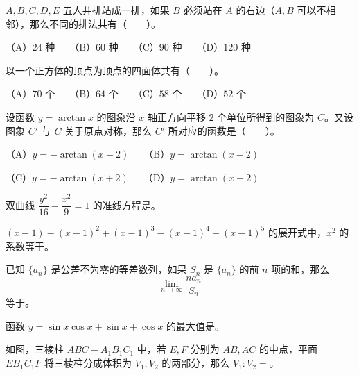 \begin{question}
$A,B,C,D,E$ 五人并排站成一排，如果 $B$ 必须站在 $A$ 的右边（$A,B$ 可以不相邻），那么不同的排法共有\mbox{（　　）}。

（A）$24$ 种　　（B）$60$ 种　　（C）$90$ 种　　（D）$120$ 种

\end{question}
\begin{question}
以一个正方体的顶点为顶点的四面体共有\mbox{（　　）}。

（A）$70$ 个　　（B）$64$ 个　　（C）$58$ 个　　（D）$52$ 个

\end{question}
\begin{question}
设函数 $y=\arctan x$ 的图象沿 $x$ 轴正方向平移 $2$ 个单位所得到的图象为 $C$。又设图象 $C'$ 与 $C$ 关于原点对称，那么 $C'$ 所对应的函数是\mbox{（　　）}。

（A）$y=-\arctan(x-2)$　　（B）$y=\arctan(x-2)$

（C）$y=-\arctan(x+2)$　　（D）$y=\arctan(x+2)$

\end{question}

\begin{question}
双曲线 $\dfrac{y^2}{16}-\dfrac{x^2}{9}=1$ 的准线方程是\gkblank{}。

\end{question}
\begin{question}
$(x-1)-(x-1)^2+(x-1)^3-(x-1)^4+(x-1)^5$ 的展开式中，$x^2$ 的系数等于\gkblank{}。

\end{question}
\begin{question}
已知 $\{a_n\}$ 是公差不为零的等差数列，如果 $S_n$ 是 $\{a_n\}$ 的前 $n$ 项的和，那么
\nopagebreak[4]
\[
\lim_{n\to\infty}\frac{na_n}{S_n}
\]
等于\gkblank{}。

\end{question}
\begin{question}
函数 $y=\sin x\cos x+\sin x+\cos x$ 的最大值是\gkblank{}。

\Needspace{0.4\textheight}
\end{question}
\begin{question}
如图，三棱柱 $ABC-A_1B_1C_1$ 中，若 $E,F$ 分别为 $AB,AC$ 的中点，平面 $EB_1C_1F$ 将三棱柱分成体积为 $V_1,V_2$ 的两部分，那么 $V_1:V_2=$\gkblank{}。
\nopagebreak[4]
\begin{center}\end{center}
\nopagebreak[4]
\end{question}

